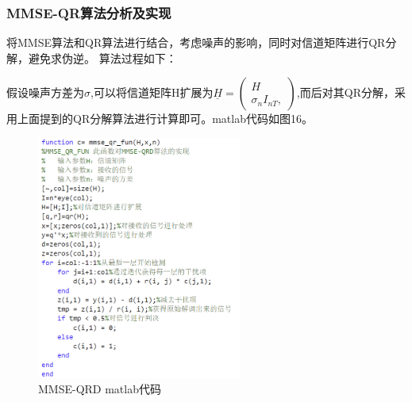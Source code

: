 \documentclass[a4paper,12pt]{article}
\begin{document}
	\subsubsection{MMSE-QR算法分析及实现}
	将MMSE算法和QR算法进行结合，考虑噪声的影响，同时对信道矩阵进行QR分解，避免求伪逆。
	算法过程如下：\par
	假设噪声方差为$\sigma$,可以将信道矩阵H扩展为$\underline{H}=\begin{pmatrix}
		H\\ \sigma_{n}I_{nT},
	\end{pmatrix}$,而后对其QR分解，采用上面提到的QR分解算法进行计算即可。matlab代码如图16。
	\begin{figure}[h]
		\centering
		\includegraphics[width=0.6\textwidth]{16.png}
		\caption{MMSE-QRD matlab代码}
	\end{figure}
	\newpage
\end{document}
